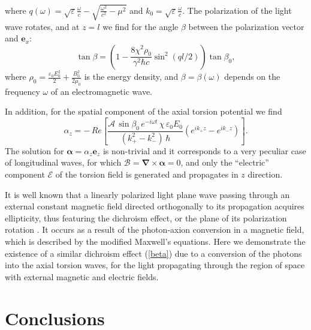 \documentclass[12pt,prd,showkeys,amsmath,amssymb,nofootinbib]{revtex4-1}
\begin{document}
where $q(\omega)=\sqrt{\varepsilon}\frac{\omega}{c} - \sqrt{\frac{\omega^2}{c^2}-\mu^2}$ and $k_0 = \sqrt{\varepsilon}\frac{\omega}{c}$. The polarization of the light wave rotates, and at $z=l$ we find for the angle $\beta$ between the polarization vector and $\bm{e}_x$:
\begin{equation}\label{beta}
\tan\beta = \left(1 - \frac{8\chi^2\rho_0}{\gamma^2\hbar c}
\sin^2({ql}/{2})\right)\tan\beta_0,
\end{equation}
where $\rho_0 = \frac{\varepsilon_0E_0^2}{2} + \frac{B_0^2}{2\mu_0}$ is the energy density, and $\beta = \beta(\omega)$ depends on the frequency $\omega$ of an electromagnetic wave.

In addition, for the spatial component of the axial torsion potential we find 
\begin{equation}
\alpha_z = -\,Re\left[{\frac{{\mathcal A}\,\sin\beta_0\,e^{-i\omega t}\,\chi\,\varepsilon_0 E_0}
{({k^2_{+} - k^2_{-}})\,\hbar}}\left(e^{ik_{+}z} - e^{ik_{-}z}\right)\right].
\end{equation}
The solution for $\bm{\alpha}=\alpha_z\bm{e}_z$ is non-trivial and it corresponds to a very peculiar case of longitudinal waves, for which $\bm{\mathcal B}=\bm{\nabla}\times\bm{\alpha}=0$, and only the ``electric'' component $\bm{\mathcal E}$ of the torsion field is generated and propagates in $z$ direction.

It is well known that a linearly polarized light plane wave passing through an external constant magnetic field directed orthogonally to its propagation acquires ellipticity, thus featuring the dichroism effect, or the plane of its polarization rotation \cite{RevModPhys.93.015004}. It occurs as a result of the photon-axion conversion in a magnetic field, which is described by the modified Maxwell's equations. Here we demonstrate the existence of a similar dichroism effect (\ref{beta}) due to a conversion of the photons into the axial torsion waves, for the light propagating through the region of space with external magnetic and electric fields.


\section{Conclusions}
\end{document}
